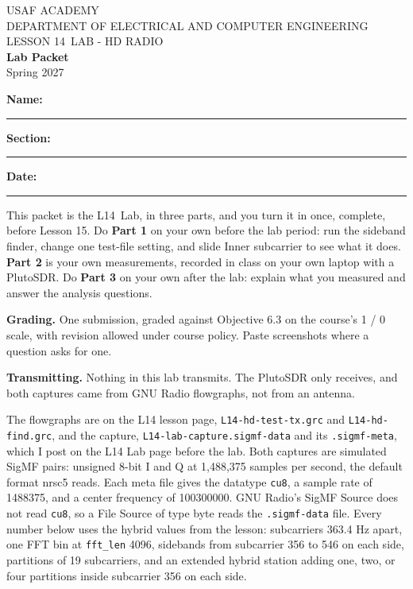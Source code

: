 \documentclass{exam}
\def\labLesson{14}
\def\thisterm{\thisTermIn}
\def\thisterm{Spring 2027}
\begin{document}
\pagestyle{headandfoot}   %


\begin{center}
USAF ACADEMY \\
DEPARTMENT OF ELECTRICAL AND COMPUTER ENGINEERING \\
LESSON \labLesson\ LAB - HD RADIO \\
\textbf{Lab Packet} \\
\thisterm \\[4mm]
\end{center}

\vspace{-4pt}
\textbf{Name:} \rule[-2pt]{2.6in}{0.4pt} \hfill
\textbf{Section:} \rule[-2pt]{0.9in}{0.4pt} \hfill
\textbf{Date:} \rule[-2pt]{1.1in}{0.4pt}

\vspace{4pt}


\vspace{2pt}

This packet is the L\labLesson\ Lab, in three parts, and you turn it in once, complete,
before Lesson 15. Do \textbf{Part 1} on your own before the lab period: run the sideband
finder, change one test-file setting, and slide Inner subcarrier to see what it does. \textbf{Part 2} is your own
measurements, recorded in class on your own laptop with a PlutoSDR. Do \textbf{Part 3}
on your own after the lab: explain what you measured and answer the
analysis questions.

\textbf{Grading.} One submission, graded against Objective 6.3 on the course's
1 / 0 scale, with revision allowed under course policy. Paste screenshots where a
question asks for one.

\textbf{Transmitting.} Nothing in this lab transmits. The PlutoSDR only receives, and both
captures came from GNU Radio flowgraphs, not from an antenna.

The flowgraphs are on the L14 lesson page, \texttt{L14-hd-test-tx.grc} and
\texttt{L14-hd-find.grc}, and the capture, \texttt{L14-lab-capture.sigmf-data} and its
\texttt{.sigmf-meta}, which I post on the L14 Lab page before the lab. Both captures are
simulated SigMF pairs: unsigned 8-bit I and Q at 1,488,375 samples per second, the default
format nrsc5 reads. Each meta file gives the datatype \texttt{cu8}, a sample rate of 1488375,
and a center frequency of 100300000. GNU Radio's SigMF Source does not read \texttt{cu8}, so
a File Source of type byte reads the \texttt{.sigmf-data} file. Every number below uses the hybrid values from
the lesson: subcarriers 363.4 Hz apart, one FFT bin at \texttt{fft\_len} 4096, sidebands from
subcarrier 356 to 546 on each side, partitions of 19 subcarriers, and an extended hybrid
station adding one, two, or four partitions inside subcarrier 356 on each side.
\end{document}
